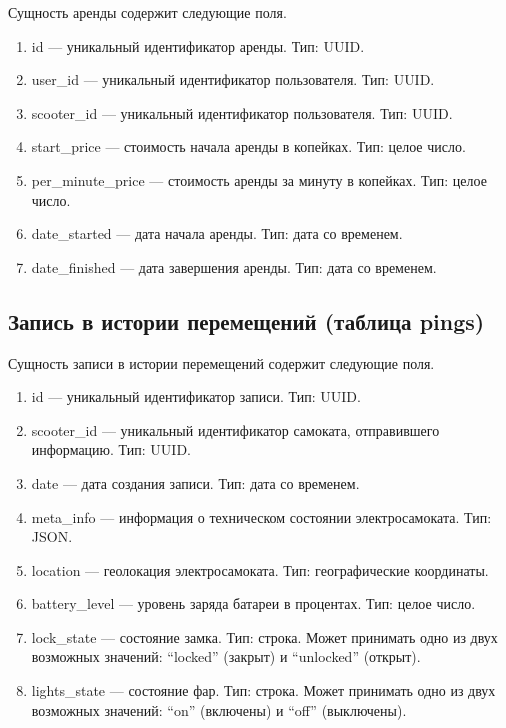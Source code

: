 Сущность аренды содержит следующие поля.

\begin{enumerate}
	\item id --- уникальный идентификатор аренды. Тип: UUID.
	\item user\_id --- уникальный идентификатор пользователя. Тип: UUID.
	\item scooter\_id --- уникальный идентификатор пользователя. Тип: UUID.
	\item start\_price --- стоимость начала аренды в копейках. Тип: целое число.
	\item per\_minute\_price --- стоимость аренды за минуту в копейках. Тип: целое число.
	\item date\_started --- дата начала аренды. Тип: дата со временем.
	\item date\_finished --- дата завершения аренды. Тип: дата со временем.
\end{enumerate}

\subsection{Запись в истории перемещений (таблица pings)}

Сущность записи в истории перемещений содержит следующие поля.

\begin{enumerate}
	\item id --- уникальный идентификатор записи. Тип: UUID.
	\item scooter\_id --- уникальный идентификатор самоката, отправившего информацию.
	      Тип: UUID.
	\item date --- дата создания записи. Тип: дата со временем.
	\item meta\_info --- информация о техническом состоянии электросамоката. Тип: JSON.
	\item location --- геолокация электросамоката. Тип: географические координаты.
	\item battery\_level --- уровень заряда батареи в процентах. Тип: целое число.
	\item lock\_state --- состояние замка. Тип: строка. Может принимать одно из двух
	      возможных значений: \enquote{locked} (закрыт) и \enquote{unlocked} (открыт).
	\item lights\_state --- состояние фар. Тип: строка. Может принимать одно из двух
	      возможных значений: \enquote{on} (включены) и \enquote{off} (выключены).
\end{enumerate}

